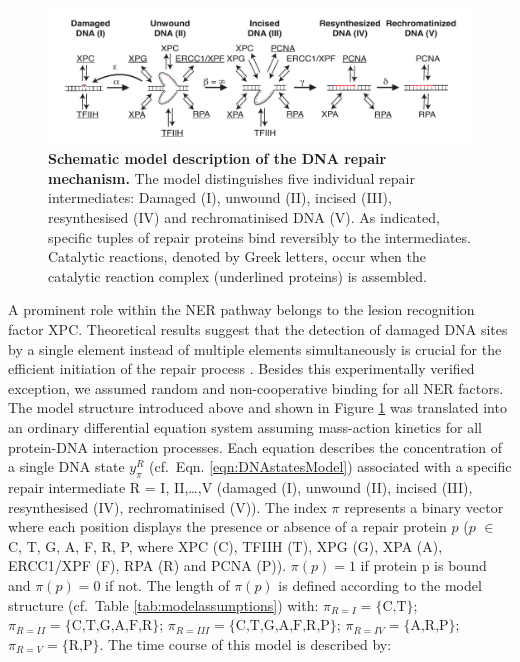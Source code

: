 \begin{figure}[t!]
\begin{center}
\includegraphics[width=1\textwidth]{Abbildungen/figure2_5.pdf}
\caption{\textbf{Schematic model description of the DNA repair mechanism.} The model distinguishes five individual repair intermediates: Damaged (I), unwound (II), incised (III), resynthesised (IV) and rechromatinised DNA (V). As indicated, specific tuples of repair proteins bind reversibly to the intermediates. Catalytic reactions, denoted by Greek letters, occur when the catalytic reaction complex (underlined proteins) is assembled.}
\label{fig:ModelStructure}
\end{center}
\end{figure}
A prominent role within the NER pathway belongs to the lesion recognition factor XPC. Theoretical results suggest that the detection of damaged DNA sites by a single element instead of multiple elements simultaneously is crucial for the efficient initiation of the repair process \cite{Politi2005,Volker2001}. Besides this experimentally verified exception, we assumed random and non-cooperative binding for all NER factors.\\    
The model structure introduced above and shown in Figure \ref{fig:ModelStructure} was translated into an ordinary differential equation system assuming mass-action kinetics for all protein-DNA interaction processes. Each equation describes the concentration of a single DNA state $y_{\pi}^{R}$ (cf.\ Eqn. \ref{eqn:DNAstatesModel}) associated with a specific repair intermediate R = I, II,\dots,V (damaged (I), unwound (II), incised (III), resynthesised (IV), rechromatinised (V)). The index $\pi$ represents a binary vector where each position displays the presence or absence of a repair protein $p$ ($p$ $\in$ {C, T, G, A, F, R, P}, where XPC (C), TFIIH (T), XPG (G), XPA (A), ERCC1/XPF (F), RPA (R) and PCNA (P)). $\pi(p)=1$ if protein p is bound and $\pi(p)=0$ if not. The length of $\pi(p)$ is defined according to the model structure (cf.\ Table \ref{tab:modelassumptions}) with: $\pi_{R=I} = \{ \text{C,T} \}$; $\pi_{R=II} = \{ \text{C,T,G,A,F,R} \}$; $\pi_{R=III} = \{ \text{C,T,G,A,F,R,P} \}$; $\pi_{R=IV} = \{ \text{A,R,P} \}$; $\pi_{R=V} = \{ \text{R,P} \}$. The time course of this model is described by:

